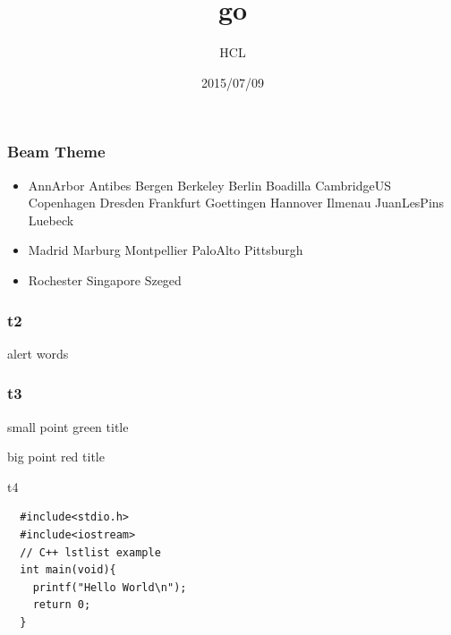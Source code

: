 \documentclass[xcolor=dvipsnames, utf8]{beamer}
\begin{document}
\begin{CJK}{UTF8}{bsmi}
\title{go}
\author{HCL}
\date{2015/07/09}

\begin{frame}
\titlepage
\end{frame}

\begin{frame}
\frametitle{Beam Theme}
\begin{itemize}
\item<1-> AnnArbor
Antibes
Bergen
Berkeley
Berlin
Boadilla
CambridgeUS
Copenhagen
Dresden
Frankfurt
Goettingen
Hannover
Ilmenau
JuanLesPins
Luebeck
\item<2->Madrid
Marburg
Montpellier
PaloAlto
Pittsburgh
\item<3->Rochester
Singapore
Szeged
\end{itemize}
\end{frame}

\begin{frame}
\frametitle{t2}
\color{green}{green words\\}
\alert{alert words}
\end{frame}

\begin{frame}[label=t3]
\frametitle{t3}
\begin{block}{small point}
green title
\end{block}

\begin{alertblock}{big point}
red title
\end{alertblock}

\end{frame}

\begin{frame}[fragile]{t4}
\begin{lstlisting}
  #include<stdio.h>
  #include<iostream>
  // C++ lstlist example
  int main(void){
    printf("Hello World\n");
    return 0;
  }
\end{lstlisting}


\end{frame}
\end{CJK}
\end{document}
